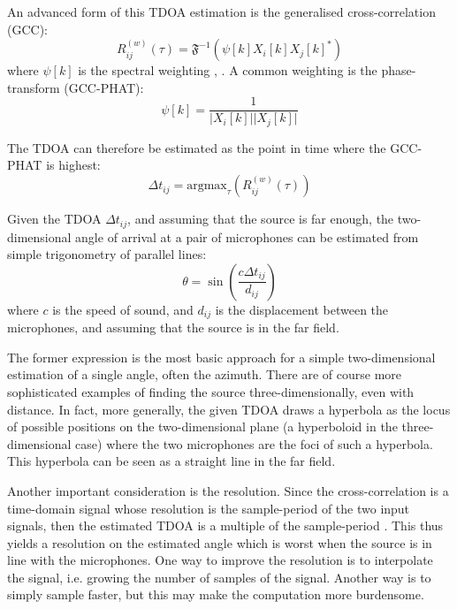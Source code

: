 \documentclass{report}
\begin{document}
An advanced form of this TDOA estimation is the generalised cross-correlation (GCC):
\begin{equation}
R^{(w)}_{ij}(\tau) = \mathfrak{F}^{-1} \left( \psi[k]X_i[k]X_j[k]^* \right)
\end{equation}
where $\psi[k]$ is the spectral weighting \cite{argentieri_survey_2015}, \cite{rascon_localization_2017}. A common weighting is the phase-transform (GCC-PHAT):
\begin{equation}
\psi[k] = \frac{1}{\lvert X_i[k] \rvert \lvert X_j[k] \rvert}
\end{equation}

The TDOA can therefore be estimated as the point in time where the GCC-PHAT is highest:
\begin{equation}
\Delta t_{ij} = \text{argmax}_\tau \left( R^{(w)}_{ij} (\tau) \right)
\end{equation}

Given the TDOA $\Delta t_{ij}$, and assuming that the source is far enough, the two-dimensional angle of arrival at a pair of microphones can be estimated from simple trigonometry of parallel lines:
\begin{equation}
\theta = \sin\left( \frac{c\Delta t_{ij}}{d_{ij}} \right)
\end{equation}
where $c$ is the speed of sound, and $d_{ij}$ is the displacement between the microphones, and assuming that the source is in the far field.

The former expression is the most basic approach for a simple two-dimensional estimation of a single angle, often the azimuth. There are of course more sophisticated examples of finding the source three-dimensionally, even with distance. In fact, more generally, the given TDOA draws a hyperbola as the locus of possible positions on the two-dimensional plane (a hyperboloid in the three-dimensional case) where the two microphones are the foci of such a hyperbola. This hyperbola can be seen as a straight line in the far field.

Another important consideration is the resolution. Since the cross-correlation is a time-domain signal whose resolution is the sample-period of the two input signals, then the estimated TDOA is a multiple of the sample-period \cite{argentieri_survey_2015}. This thus yields a resolution on the estimated angle which is worst when the source is in line with the microphones. One way to improve the resolution is to interpolate the signal, i.e. growing the number of samples of the signal. Another way is to simply sample faster, but this may make the computation more burdensome.
\end{document}
